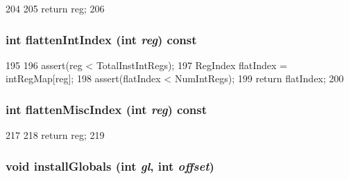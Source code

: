 \begin{DoxyCode}
204     {
205         return reg;
206     }
\end{DoxyCode}
\hypertarget{classSparcISA_1_1ISA_aece4b88ffcab608652e8e9f0fbe643d4}{
\subsubsection[{flattenIntIndex}]{\setlength{\rightskip}{0pt plus 5cm}int flattenIntIndex (int {\em reg}) const}}
\label{classSparcISA_1_1ISA_aece4b88ffcab608652e8e9f0fbe643d4}



\begin{DoxyCode}
195     {
196         assert(reg < TotalInstIntRegs);
197         RegIndex flatIndex = intRegMap[reg];
198         assert(flatIndex < NumIntRegs);
199         return flatIndex;
200     }
\end{DoxyCode}
\hypertarget{classSparcISA_1_1ISA_a8997760aa4425793911f57440a4dd8ae}{
\subsubsection[{flattenMiscIndex}]{\setlength{\rightskip}{0pt plus 5cm}int flattenMiscIndex (int {\em reg}) const}}
\label{classSparcISA_1_1ISA_a8997760aa4425793911f57440a4dd8ae}



\begin{DoxyCode}
217     {
218         return reg;
219     }
\end{DoxyCode}
\hypertarget{classSparcISA_1_1ISA_a8bccf96ba4158dc5a446b2236c8743ae}{
\subsubsection[{installGlobals}]{\setlength{\rightskip}{0pt plus 5cm}void installGlobals (int {\em gl}, \/  int {\em offset})}}
\label{classSparcISA_1_1ISA_a8bccf96ba4158dc5a446b2236c8743ae}



